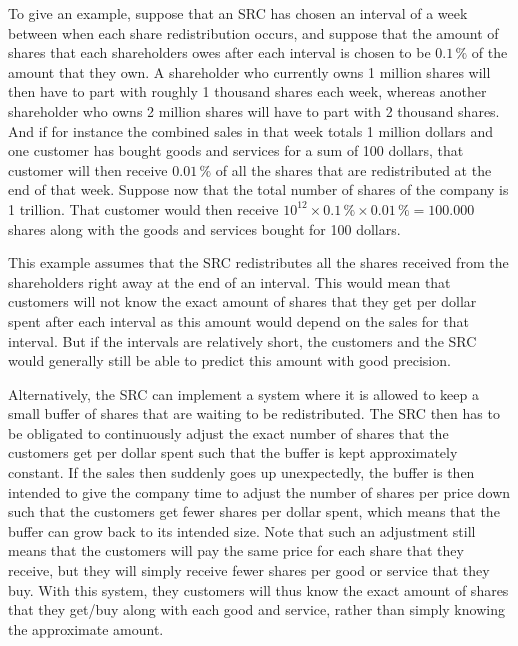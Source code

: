 \documentclass{article}
\begin{document}
To give an example, suppose that an SRC has chosen an interval of a week between when each share redistribution occurs, and suppose that the amount of shares that each shareholders owes after each interval is chosen to be $0.1\, \%$ of the amount that they own. A shareholder who currently owns 1 million shares will then have to part with roughly 1 thousand shares each week, whereas another shareholder who owns 2 million shares will have to part with 2 thousand shares. And if for instance the combined sales in that week totals 1 million dollars and one customer has bought goods and services for a sum of 100 dollars, that customer will then receive $0.01\,\%$ of all the shares that are redistributed at the end of that week. 
Suppose now that the total number of shares of the company is 1 trillion. That customer would then receive $10^{12} \times 0.1\,\% \times 0.01\,\% = 100.000$ shares along with the goods and services bought for 100 dollars. 

This example assumes that the SRC redistributes all the shares received from the shareholders right away at the end of an interval. This would mean that customers will not know the exact amount of shares that they get per dollar spent after each interval as this amount would depend on the sales for that interval. But if the intervals are relatively short, the customers and the SRC would generally still be able to predict this amount with good precision. 

Alternatively, the SRC can implement a system where it is allowed to keep a small buffer of shares that are waiting to be redistributed. The SRC then has to be obligated to continuously adjust the exact number of shares that the customers get per dollar spent such that the buffer is kept approximately constant. If the sales then suddenly goes up unexpectedly, the buffer is then intended to give the company time to adjust the number of shares per price down such that the customers get fewer shares per dollar spent, which means that the buffer can grow back to its intended size. Note that such an adjustment still means that the customers will pay the same price for each share that they receive, but they will simply receive fewer shares per good or service that they buy. With this system, they customers will thus know the exact amount of shares that they get/buy along with each good and service, rather than simply knowing the approximate amount. 

\end{document}
